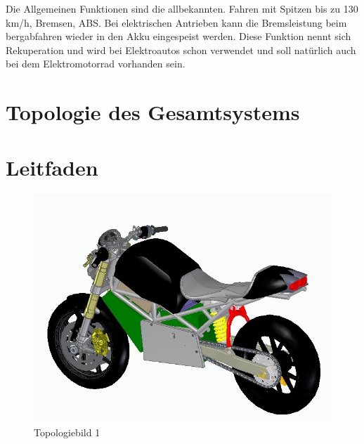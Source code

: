 Die Allgemeinen Funktionen sind die allbekannten. Fahren mit Spitzen bis zu 130 km/h, Bremsen, ABS. Bei elektrischen Antrieben kann die Bremsleistung beim bergabfahren wieder in den Akku eingespeist werden. Diese Funktion nennt sich Rekuperation und wird bei Elektroautos schon verwendet und soll natürlich auch bei dem Elektromotorrad vorhanden sein.
\newpage

\section{Topologie des Gesamtsystems}

\section{Leitfaden}

\begin{figure} [H]
	\begin{center}
		\includegraphics[scale=0.9] {figures/mechanik/Ducati1 .jpg}
		\caption{Topologiebild 1}
		\label{fig:Topologiebild 1}
	\end{center}
\end{figure}


